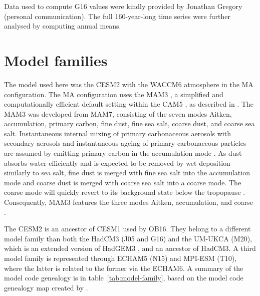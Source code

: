 \documentclass[draft]{agujournal2019}
\begin{document}
Data used to compute G16 values were kindly provided by Jonathan Gregory (personal
communication). The full 160-year-long time series were further analysed by computing
annual means.

\section{Model families}

The model used here was the CESM2 with the WACCM6 atmosphere in the MA configuration.
The MA configuration uses the MAM3 \cite{gettleman2019}, a simplified and
computationally efficient default setting within the CAM5 \cite{liu2016}, as described
in . The MAM3 was developed from MAM7, consisting of the seven modes
Aitken, accumulation, primary carbon, fine dust, fine sea salt, coarse dust, and coarse
sea salt. Instantaneous internal mixing of primary carbonaceous aerosols with secondary
aerosols and instantaneous ageing of primary carbonaceous particles are assumed by
emitting primary carbon in the accumulation mode \cite{liu2016}. As dust absorbs water
efficiently and is expected to be removed by wet deposition similarly to sea salt, fine
dust is merged with fine sea salt into the accumulation mode and coarse dust is merged
with coarse sea salt into a coarse mode. The coarse mode will quickly revert to its
background state below the tropopause \cite{liu2012}. Consequently, MAM3 features the
three modes Aitken, accumulation, and coarse \cite{liu2016}.

The CESM2 is an ancestor of CESM1 used by OB16. They belong to a different model family
than both the HadCM3 (J05 and G16) and the UM-UKCA (M20), which is an extended version
of HadGEM3 \cite{dhomse2014}, and an ancestor of HadCM3. A third model family is
represented through ECHAM5 (N15) and MPI-ESM (T10), where the latter is related to the
former via the ECHAM6. A summary of the model code genealogy is in
table~\ref{tab:model-family}, based on the model code genealogy map created by
.
\end{document}

